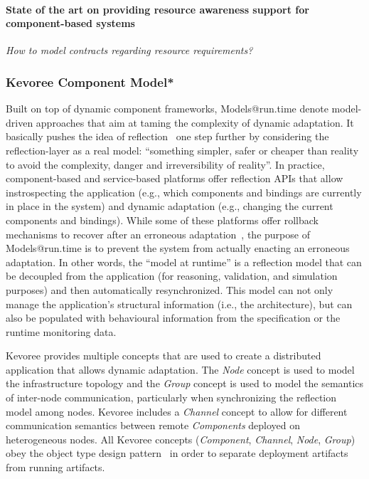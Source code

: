 \paragraph{State of the art on providing resource awareness support for component-based systems}


\textit{How to model contracts regarding resource requirements?}

%
%
%
%


\subsubsection{Kevoree Component Model*}
Built on top of dynamic component frameworks, Models@run.time denote model-driven approaches that aim at taming the complexity of dynamic adaptation.
It basically pushes the idea of reflection~\cite{morin09a} one step further by considering the reflection-layer as a real model: ``something simpler, safer or cheaper than reality to avoid the complexity, danger and irreversibility of reality''.
In practice, component-based and service-based platforms offer reflection APIs that allow instrospecting the application (e.g., which components and bindings are currently in place in the system) and dynamic adaptation (e.g., changing the current components and bindings).
While some of these platforms offer rollback mechanisms to recover after an erroneous adaptation~\cite{leger2010reliable}, the purpose of Models@run.time is to prevent the system from actually enacting an erroneous adaptation. 
In other words, the ``model at runtime'' is a reflection model that can be decoupled from the application (for reasoning, validation, and simulation purposes) and then automatically resynchronized.
This model can not only manage the application's structural information (i.e., the architecture), but can also be populated with behavioural information from the specification or the runtime monitoring data.

Kevoree provides multiple concepts that are used to create a distributed application that allows dynamic adaptation. The \emph{Node} concept is used to model the infrastructure topology and the \emph{Group} concept is used to model the semantics of inter-node communication, particularly when synchronizing the reflection model among nodes. 
Kevoree includes a \emph{Channel} concept to allow for different communication semantics between remote \emph{Components} deployed on heterogeneous nodes. 
All Kevoree concepts (\textit{Component}, \textit{Channel}, \textit{Node}, \textit{Group}) obey the object type design pattern~\cite{johnson_type_1997} in order to separate deployment artifacts from running artifacts.  


